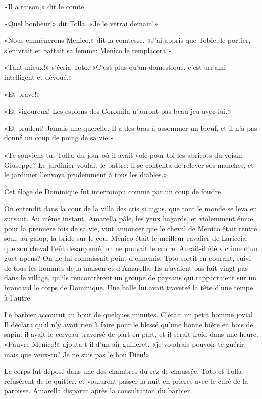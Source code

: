 «Il a raison,» dit le comte.

«Quel bonheur!» dit Tolla. «Je le verrai demain!»

«Nous emmènerons Menico,» dit la comtesse. «J'ai appris que Tobie, le
portier, s'enivrait et battait sa femme: Menico le remplacera.»

«Tant mieux!» s'écria Toto. «C'est plus qu'un domestique, c'est un ami
intelligent et dévoué.»

«Et brave!»

«Et vigoureux! Les espions des Coromila n'auront pas beau jeu avec lui.»

«Et prudent! Jamais une querelle. Il a des bras à assommer un bœuf, et
il n'a pas donné un coup de poing de sa vie.»

«Te souviens-tu, Tolla, du jour où il avait volé pour toi les abricots
du voisin Giuseppe? Le jardinier voulait le battre: il se contenta de
relever ses manches, et le jardinier l'envoya prudemment à tous les
diables.»

Cet éloge de Dominique fut interrompu comme par un coup de foudre.

On entendit dans la cour de la villa des cris si aigus, que tout le
monde se leva en sursaut. Au même instant, Amarella pâle, les yeux
hagards, et violemment émue pour la première fois de sa vie, vint
annoncer que le cheval de Menico était rentré seul, au galop, la bride
sur le cou. Menico était le meilleur cavalier de Lariccia: que son
cheval l'eût désarçonné, on ne pouvait le croire. Aurait-il été victime
d'un guet-apens? On ne lui connaissait point d'ennemis. Toto sortit en
courant, suivi de tous les hommes de la maison et d'Amarella. Ils
n'avaient pas fait vingt pas dans le village, qu'ils rencontrèrent un
groupe de paysans qui rapportaient sur un brancard le corps de
Dominique. Une balle lui avait traversé la tête d'une tempe à l'autre.

Le barbier accourut au bout de quelques minutes. C'était un petit homme
jovial. Il déclara qu'il n'y avait rien à faire pour le blessé qu'une
bonne bière en bois de sapin: il avait le cerveau traversé de part en
part, et il serait froid dans une heure. «Pauvre Menico!» ajouta-t-il
d'un air guilleret, «je voudrais pouvoir te guérir; mais que veux-tu? Je
ne suis pas le bon Dieu!»

Le corps fut déposé dans une des chambres du rez-de-chaussée. Toto et
Tolla refusèrent de le quitter, et voulurent passer la nuit en prières
avec le curé de la paroisse. Amarella disparut après la consultation du
barbier.

